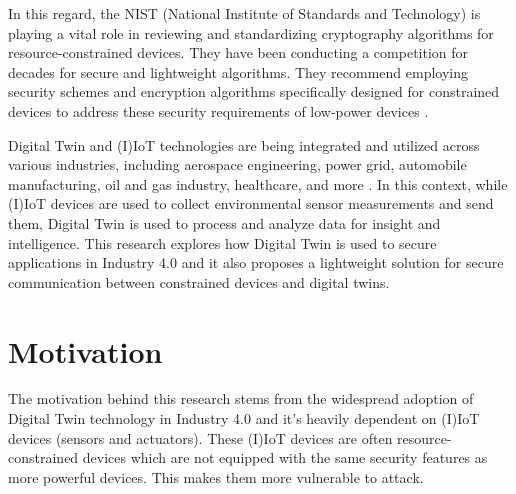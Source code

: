 








In this regard, the NIST (National Institute of Standards and Technology) is playing a vital role in reviewing and standardizing cryptography algorithms for resource-constrained devices. They have been conducting a competition for decades for secure and lightweight algorithms. They recommend employing security schemes and encryption algorithms specifically designed for constrained devices to address these security requirements of low-power devices \cite{noauthor_nist_2023}.

Digital Twin and (I)IoT technologies are being integrated and utilized across various industries, including aerospace engineering, power grid, automobile manufacturing, oil and gas industry, healthcare, and more \cite{tao_digital_2019}. In this context, while (I)IoT devices are used to collect environmental sensor measurements and send them,  Digital Twin is used to process and analyze data for insight and intelligence. This research explores how Digital Twin is used to secure applications in Industry 4.0 and it also proposes a lightweight solution for secure communication between constrained devices and digital twins.



\section{Motivation}
The motivation behind this research stems from the widespread adoption of Digital Twin technology in Industry 4.0 \cite{atalay_digital_2022} and it's heavily dependent on (I)IoT devices (sensors and actuators). These (I)IoT devices are often resource-constrained devices which are not equipped with the same security features as more powerful devices. This makes them more vulnerable to attack.

